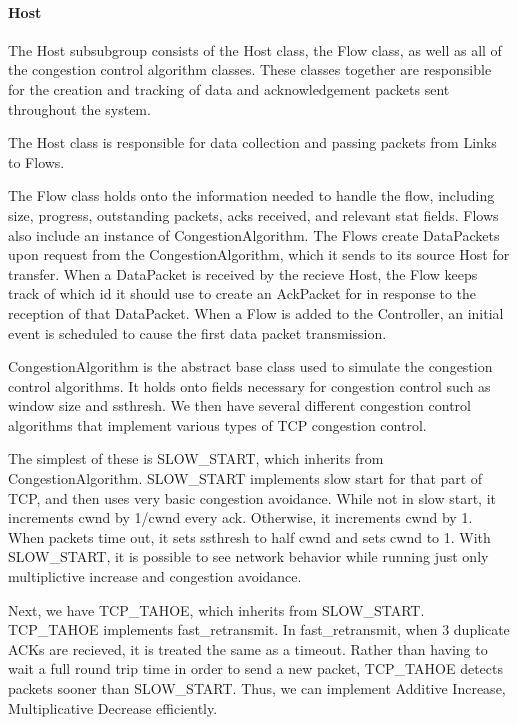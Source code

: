     \paragraph{Host} The Host subsubgroup consists of the Host class, the Flow class, as well as all of the congestion control algorithm classes. These classes together are responsible for the creation and tracking of data and acknowledgement packets sent throughout the system.
    
    The Host class is responsible for data collection and passing packets from Links to Flows. 
    
    The Flow class holds onto the information needed to handle the flow, including size, progress, outstanding packets, acks received, and relevant stat fields. Flows also include an instance of CongestionAlgorithm. The Flows create DataPackets upon request from the CongestionAlgorithm, which it sends to its source Host for transfer. When a DataPacket is received by the recieve Host, the Flow keeps track of which id it should use to create an AckPacket for in response to the reception of that DataPacket. When a Flow is added to the Controller, an initial event is scheduled to cause the first data packet transmission. 
    
    CongestionAlgorithm is the abstract base class used to simulate the congestion control algorithms. It holds onto fields necessary for congestion control such as window size and ssthresh. We then have several different congestion control algorithms that implement various types of TCP congestion control. 
    
    The simplest of these is SLOW\_START, which inherits from CongestionAlgorithm. SLOW\_START implements slow start for that part of TCP, and then uses very basic congestion avoidance. While not in slow start, it increments cwnd by 1/cwnd every ack. Otherwise, it increments cwnd by 1. When packets time out, it sets ssthresh to half cwnd and sets cwnd to 1. With SLOW\_START, it is possible to see network behavior while running just only multiplictive increase and congestion avoidance. 
    
    Next, we have TCP\_TAHOE, which inherits from SLOW\_START. TCP\_TAHOE implements fast\_retransmit. In fast\_retransmit, when 3 duplicate ACKs are recieved, it is treated the same as a timeout. Rather than having to wait a full round trip time in order to send a new packet, TCP\_TAHOE detects packets sooner than SLOW\_START. Thus, we can implement Additive Increase, Multiplicative Decrease efficiently. 
    
